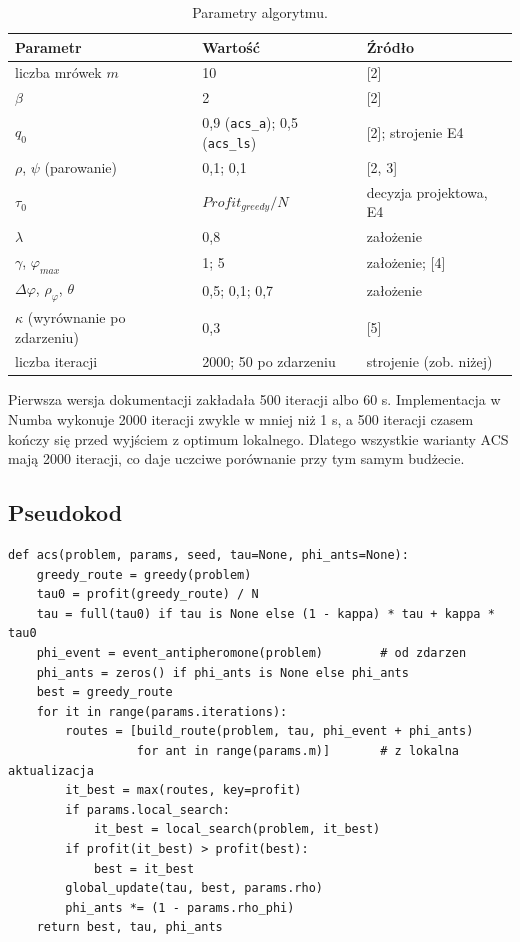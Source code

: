 \documentclass[11pt,a4paper]{article}
\begin{document}
\begin{table}[h]
\centering
\caption{Parametry algorytmu.}
\begin{tabular}{lll}
\toprule
Parametr & Wartość & Źródło \\
\midrule
liczba mrówek $m$ & 10 & [2] \\
$\beta$ & 2 & [2] \\
$q_0$ & 0,9 (\texttt{acs\_a}); 0,5 (\texttt{acs\_ls}) & [2]; strojenie E4 \\
$\rho$, $\psi$ (parowanie) & 0,1; 0,1 & [2, 3] \\
$\tau_0$ & $Profit_{greedy}/N$ & decyzja projektowa, E4 \\
$\lambda$ & 0,8 & założenie \\
$\gamma$, $\varphi_{max}$ & 1; 5 & założenie; [4] \\
$\Delta\varphi$, $\rho_\varphi$, $\theta$ & 0,5; 0,1; 0,7 & założenie \\
$\kappa$ (wyrównanie po zdarzeniu) & 0,3 & [5] \\
liczba iteracji & 2000; 50 po zdarzeniu & strojenie (zob. niżej) \\
\bottomrule
\end{tabular}
\end{table}

Pierwsza wersja dokumentacji zakładała 500 iteracji albo 60 s. Implementacja w Numba wykonuje 2000 iteracji zwykle w mniej niż 1 s, a 500 iteracji czasem kończy się przed wyjściem z optimum lokalnego. Dlatego wszystkie warianty ACS mają 2000 iteracji, co daje uczciwe porównanie przy tym samym budżecie.

\subsection{Pseudokod}

\begin{verbatim}
def acs(problem, params, seed, tau=None, phi_ants=None):
    greedy_route = greedy(problem)
    tau0 = profit(greedy_route) / N
    tau = full(tau0) if tau is None else (1 - kappa) * tau + kappa * tau0
    phi_event = event_antipheromone(problem)        # od zdarzen
    phi_ants = zeros() if phi_ants is None else phi_ants
    best = greedy_route
    for it in range(params.iterations):
        routes = [build_route(problem, tau, phi_event + phi_ants)
                  for ant in range(params.m)]       # z lokalna aktualizacja
        it_best = max(routes, key=profit)
        if params.local_search:
            it_best = local_search(problem, it_best)
        if profit(it_best) > profit(best):
            best = it_best
        global_update(tau, best, params.rho)
        phi_ants *= (1 - params.rho_phi)
    return best, tau, phi_ants
\end{verbatim}
\end{document}

